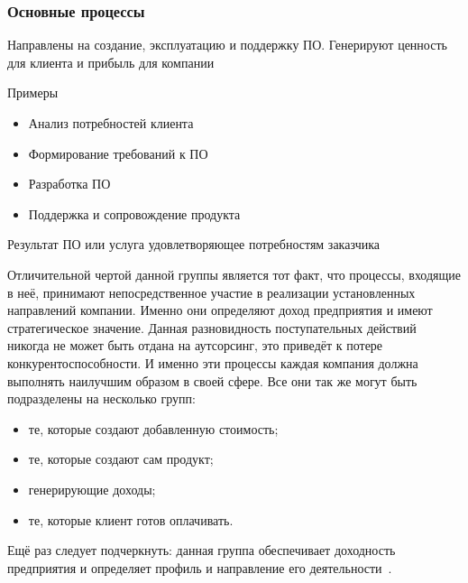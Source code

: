 \documentclass{../industrial-development}
\begin{document}
\begin{frame} \frametitle{Основные процессы}
	\begin{block}{}
		Направлены на создание, эксплуатацию и поддержку ПО. Генерируют ценность для клиента и прибыль для компании
	\end{block}
	\begin{block}{Примеры}
		\begin{itemize}
			\item Анализ потребностей клиента
			\item Формирование требований к ПО
			\item Разработка ПО
			\item Поддержка и сопровождение продукта
		\end{itemize}
	\end{block}
	\begin{block}{Результат}
		ПО или услуга удовлетворяющее потребностям заказчика
	\end{block}
\end{frame}

\lecturenotes

Отличительной чертой данной группы является тот факт, что процессы, входящие в неё, принимают непосредственное участие в реализации установленных направлений компании. Именно они определяют доход предприятия и имеют стратегическое значение. Данная разновидность поступательных действий никогда не может быть отдана на аутсорсинг, это приведёт к потере конкурентоспособности. И именно эти процессы каждая компания должна выполнять наилучшим образом в своей сфере. Все они так же могут быть подразделены на несколько групп:
\begin{itemize}
	\item те, которые создают добавленную стоимость;
	\item те, которые создают сам продукт;
	\item генерирующие доходы;
	\item те, которые клиент готов оплачивать.
\end{itemize}
Ещё раз следует подчеркнуть: данная группа обеспечивает доходность предприятия и определяет профиль и направление его деятельности~\cite{Vseproip}.
\end{document}
